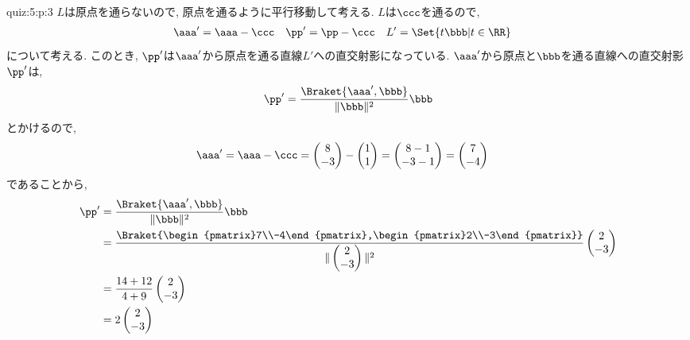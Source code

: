 \begin{answerof}{quiz:5:p:3}
  $L$は原点を通らないので, 原点を通るように平行移動して考える.
  $L$は$\ccc$を通るので,
  \begin{align*}
    \aaa'&=\aaa-\ccc&
    \pp'&=\pp-\ccc&
    L'&=\Set{t\bbb|t\in\RR}
  \end{align*}
  について考える.
  このとき, $\pp'$は$\aaa'$から原点を通る直線$L'$への直交射影になっている.
  $\aaa'$から原点と$\bbb$を通る直線への直交射影$\pp'$は,
  \begin{align*}
    \pp'=\frac{\Braket{\aaa',\bbb}}{\|\bbb\|^2}\bbb
  \end{align*}
  とかけるので,
  \begin{align*}
    \aaa'&=\aaa-\ccc=\begin{pmatrix}8\\-3\end{pmatrix}-\begin{pmatrix}1\\1\end{pmatrix}
    =\begin{pmatrix}8-1\\-3-1\end{pmatrix}=\begin{pmatrix}7\\-4\end{pmatrix}
  \end{align*}
  であることから,
  \begin{align*}
  \pp'&=\frac{\Braket{\aaa',\bbb}}{\|\bbb\|^2}\bbb\\
  &=\frac{\Braket{\begin{pmatrix}7\\-4\end{pmatrix},\begin{pmatrix}2\\-3\end{pmatrix}}}{\|\begin{pmatrix}2\\-3\end{pmatrix}\|^2}\begin{pmatrix}2\\-3\end{pmatrix}\\
  &=\frac{14+12}{4+9}\begin{pmatrix}2\\-3\end{pmatrix}\\
      &=2\begin{pmatrix}2\\-3\end{pmatrix}\\

\end{align*}
\end{answerof}
